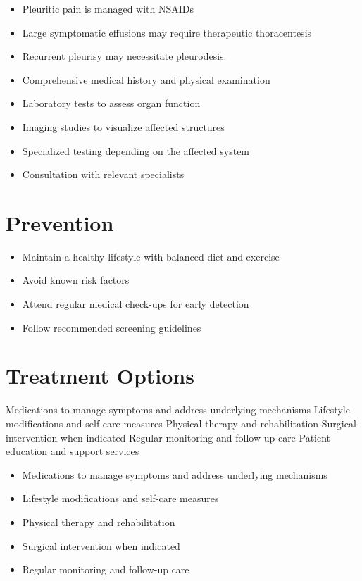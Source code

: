 \begin{itemize}[noitemsep]
  \item Pleuritic pain is managed with NSAIDs
  \item Large symptomatic effusions may require therapeutic thoracentesis
  \item Recurrent pleurisy may necessitate pleurodesis.
  \item Comprehensive medical history and physical examination
  \item Laboratory tests to assess organ function
  \item Imaging studies to visualize affected structures
  \item Specialized testing depending on the affected system
  \item Consultation with relevant specialists
\end{itemize}
\section{Prevention}
\begin{itemize}[noitemsep]
  \item Maintain a healthy lifestyle with balanced diet and exercise
  \item Avoid known risk factors
  \item Attend regular medical check-ups for early detection
  \item Follow recommended screening guidelines
\end{itemize}
\section{Treatment Options}
Medications to manage symptoms and address underlying mechanisms Lifestyle modifications and self-care measures Physical therapy and rehabilitation Surgical intervention when indicated Regular monitoring and follow-up care Patient education and support services

\begin{itemize}[noitemsep]
  \item Medications to manage symptoms and address underlying mechanisms
  \item Lifestyle modifications and self-care measures
  \item Physical therapy and rehabilitation
  \item Surgical intervention when indicated
  \item Regular monitoring and follow-up care
\end{itemize}
